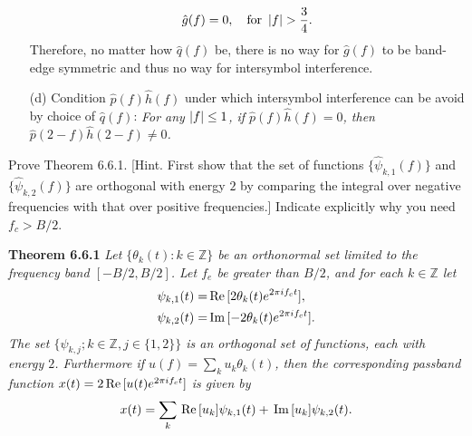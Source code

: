 \documentclass{assignment}
\begin{document}
\begin{sol}
\begin{itemize}
\begin{align}
            \hat{g}(f)=0,\quad\text{for }\left\lvert f\right\rvert>\frac{3}{4}.
        \end{align}
        Therefore, no matter how $\hat{q}(f)$ be, there is no way for $\hat{g}(f)$ to be band-edge symmetric and thus no way for intersymbol interference.
        \item[(d)] Condition $\hat{p}(f)\hat{h}(f)$ under which intersymbol interference can be avoid by choice of $\hat{q}(f)$: \emph{For any $\left\lvert f\right\rvert\leq 1$, if $\hat{p}(f)\hat{h}(f)=0$, then $\hat{p}(2-f)\hat{h}(2-f)\neq 0$.}
    \end{itemize}
\end{sol}

\begin{prob} Prove Theorem 6.6.1. [Hint. First show that the set of functions $\{\hat{\psi}_{k,1}(f)\}$ and $\{\hat{\psi}_{k,2}(f)\}$ are orthogonal with energy $2$ by comparing the integral over negative frequencies with that over positive frequencies.] Indicate explicitly why you need $f_c>B/2$.

    \begin{framed}
        \textbf{Theorem 6.6.1} \itshape Let $\{\theta_k(t):k\in\mathbb{Z}\}$ be an orthonormal set limited to the frequency band $[-B/2,B/2]$. Let $f_e$ be greater than $B/2$, and for each $k\in\mathbb{Z}$ let
        \begin{align*}
            \psi_{k,1}(t)=&\,\text{Re}\,[2\theta_k(t)e^{2\pi if_ct}],\\
            \psi_{k,2}(t)=&\,\text{Im}\,[-2\theta_k(t)e^{2\pi if_ct}].
        \end{align*}
        The set $\{\psi_{k,j};k\in\mathbb{Z},j\in\{1,2\}\}$ is an orthogonal set of functions, each with energy $2$. Furthermore if $u(f)=\sum_ku_k\theta_k(t)$, then the corresponding passband function $x(t)=2\,\text{Re}\,[u(t)e^{2\pi if_ct}]$ is given by
        \[
            x(t)=\sum_k\,\text{Re}\,[u_k]\psi_{k,1}(t)+\,\text{Im}\,[u_k]\psi_{k,2}(t).
        \]
    \end{framed}
\end{prob}
\begin{sol}
\end{sol}
\end{document}
